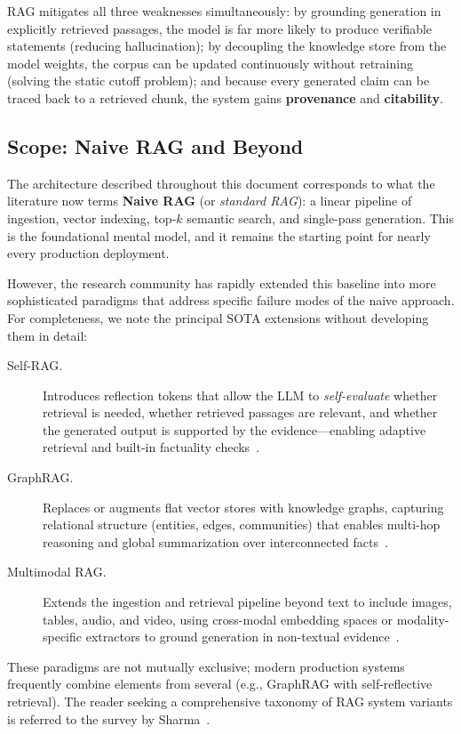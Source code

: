 \documentclass[11pt,a4paper]{article}
\begin{document}
RAG mitigates all three weaknesses simultaneously: by grounding generation in explicitly retrieved passages, the model is far more likely to produce verifiable statements (reducing hallucination); by decoupling the knowledge store from the model weights, the corpus can be updated continuously without retraining (solving the static cutoff problem); and because every generated claim can be traced back to a retrieved chunk, the system gains \textbf{provenance} and \textbf{citability}.

\subsection{Scope: Naive RAG and Beyond}

The architecture described throughout this document corresponds to what the literature now terms \textbf{Naive RAG} (or \emph{standard RAG}): a linear pipeline of ingestion, vector indexing, top-$k$ semantic search, and single-pass generation. This is the foundational mental model, and it remains the starting point for nearly every production deployment.

However, the research community has rapidly extended this baseline into more sophisticated paradigms that address specific failure modes of the naive approach. For completeness, we note the principal SOTA extensions without developing them in detail:

\begin{description}
  \item[Self-RAG.] Introduces reflection tokens that allow the LLM to \emph{self-evaluate} whether retrieval is needed, whether retrieved passages are relevant, and whether the generated output is supported by the evidence---enabling adaptive retrieval and built-in factuality checks~\cite{asai2023selfrag}.
  \item[GraphRAG.] Replaces or augments flat vector stores with knowledge graphs, capturing relational structure (entities, edges, communities) that enables multi-hop reasoning and global summarization over interconnected facts~\cite{zhang2025graphrag}.
  \item[Multimodal RAG.] Extends the ingestion and retrieval pipeline beyond text to include images, tables, audio, and video, using cross-modal embedding spaces or modality-specific extractors to ground generation in non-textual evidence~\cite{mei2025multimodal}.
\end{description}

These paradigms are not mutually exclusive; modern production systems frequently combine elements from several (e.g., GraphRAG with self-reflective retrieval). The reader seeking a comprehensive taxonomy of RAG system variants is referred to the survey by Sharma~\cite{sharma2025rag}.
\end{document}
